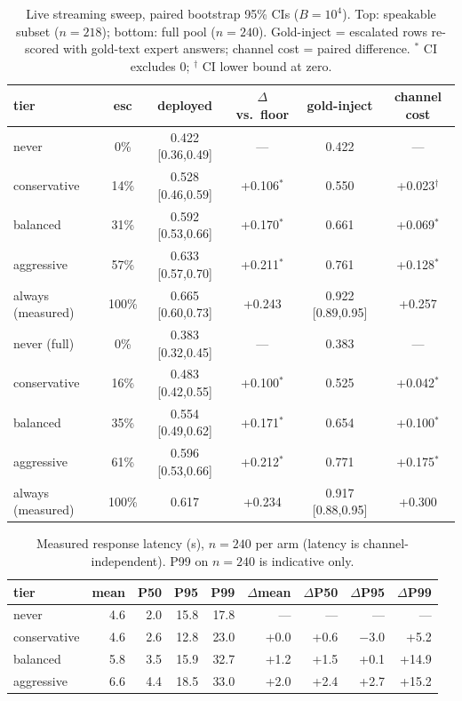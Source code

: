 \begin{table}[h]
\centering\small
\caption{Live streaming sweep, paired bootstrap 95\% CIs ($B{=}10^4$).
Top: speakable subset ($n{=}218$); bottom: full pool ($n{=}240$).
Gold-inject = escalated rows re-scored with gold-text expert answers;
channel cost = paired difference. $^{*}$ CI excludes 0;
$^{\dagger}$ CI lower bound at zero.}
\label{tab:live}
\begin{tabular}{lccccc}
\toprule
tier & esc & deployed & $\Delta$ vs.\ floor & gold-inject & channel cost \\
\midrule
never & 0\%  & 0.422 [0.36,0.49] & --- & 0.422 & --- \\
conservative  & 14\% & 0.528 [0.46,0.59] & +0.106$^{*}$ & 0.550 & +0.023$^{\dagger}$ \\
balanced      & 31\% & 0.592 [0.53,0.66] & +0.170$^{*}$ & 0.661 & +0.069$^{*}$ \\
aggressive    & 57\% & 0.633 [0.57,0.70] & +0.211$^{*}$ & 0.761 & +0.128$^{*}$ \\
always (measured) & 100\% & 0.665 [0.60,0.73] & +0.243 & 0.922 [0.89,0.95] & +0.257 \\
\midrule
never (full) & 0\%  & 0.383 [0.32,0.45] & --- & 0.383 & --- \\
conservative  & 16\% & 0.483 [0.42,0.55] & +0.100$^{*}$ & 0.525 & +0.042$^{*}$ \\
balanced      & 35\% & 0.554 [0.49,0.62] & +0.171$^{*}$ & 0.654 & +0.100$^{*}$ \\
aggressive    & 61\% & 0.596 [0.53,0.66] & +0.212$^{*}$ & 0.771 & +0.175$^{*}$ \\
always (measured) & 100\% & 0.617 & +0.234 & 0.917 [0.88,0.95] & +0.300 \\
\bottomrule
\end{tabular}
\end{table}

\begin{table}[h]
\centering\small
\caption{Measured response latency (s), $n{=}240$ per arm (latency is
channel-independent). P99 on $n{=}240$ is indicative only.}
\label{tab:latency}
\begin{tabular}{lrrrrrrrr}
\toprule
tier & mean & P50 & P95 & P99 & $\Delta$mean & $\Delta$P50 & $\Delta$P95 & $\Delta$P99 \\
\midrule
never & 4.6 & 2.0 & 15.8 & 17.8 & --- & --- & --- & --- \\
conservative  & 4.6 & 2.6 & 12.8 & 23.0 & +0.0 & +0.6 & $-$3.0 & +5.2 \\
balanced      & 5.8 & 3.5 & 15.9 & 32.7 & +1.2 & +1.5 & +0.1 & +14.9 \\
aggressive    & 6.6 & 4.4 & 18.5 & 33.0 & +2.0 & +2.4 & +2.7 & +15.2 \\
\bottomrule
\end{tabular}
\end{table}

